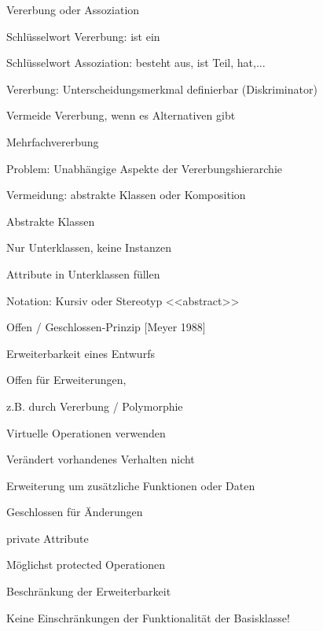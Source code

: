 \documentclass[a4paper]{article}
\begin{document}
\begin{multicols}{3}
  Vererbung oder Assoziation
  \begin{itemize*}
    \item Schlüsselwort Vererbung: ist ein
    \item Schlüsselwort Assoziation: besteht aus, ist Teil, hat,...
    \item Vererbung: Unterscheidungsmerkmal definierbar (Diskriminator)
    \item Vermeide Vererbung, wenn es Alternativen gibt
    \item Mehrfachvererbung
    \begin{itemize*}
      \item Problem: Unabhängige Aspekte der Vererbungshierarchie
      \item Vermeidung: abstrakte Klassen oder Komposition
    \end{itemize*}
  \end{itemize*}

  Abstrakte Klassen
  \begin{itemize*}
    \item Nur Unterklassen, keine Instanzen
    \item Attribute in Unterklassen füllen
    \item Notation: Kursiv oder Stereotyp <<abstract>>
  \end{itemize*}

  Offen / Geschlossen-Prinzip [Meyer 1988]
  \begin{itemize*}
    \item Erweiterbarkeit eines Entwurfs
    \item Offen für Erweiterungen,
    \begin{itemize*}
      \item z.B. durch Vererbung / Polymorphie
      \item Virtuelle Operationen verwenden
      \item Verändert vorhandenes Verhalten nicht
      \item Erweiterung um zusätzliche Funktionen oder Daten
    \end{itemize*}
    \item Geschlossen für Änderungen
    \begin{itemize*}
      \item private Attribute
      \item Möglichst protected Operationen
    \end{itemize*}
    \item Beschränkung der Erweiterbarkeit
    \begin{itemize*}
      \item Keine Einschränkungen der Funktionalität der Basisklasse!
    \end{itemize*}
  \end{itemize*}


\end{multicols}
\end{document}
